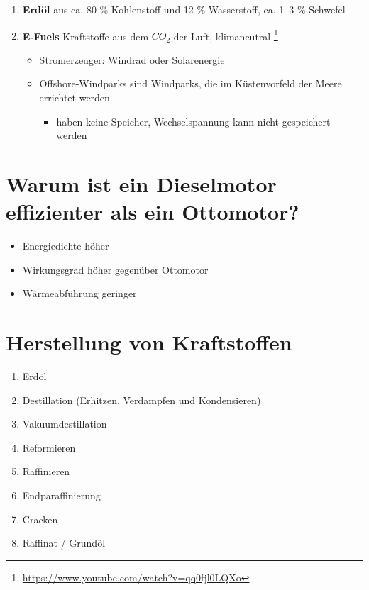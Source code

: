 \begin{enumerate}
\item
  \textbf{Erdöl} aus ca. 80 \% Kohlenstoff und 12 \% Wasserstoff, ca.
  1--3 \% Schwefel
\item
  \textbf{E-Fuels} Kraftstoffe aus dem $CO_2$ der Luft, klimaneutral
  \footnote{\url{https://www.youtube.com/watch?v=qq0fjl0LQXo}}

  \begin{itemize}
  \item
    Stromerzeuger: Windrad oder Solarenergie
  \item
    Offshore-Windparks sind Windparks, die im Küstenvorfeld der Meere
    errichtet werden.

    \begin{itemize}
    \item
      haben keine Speicher, Wechselspannung kann nicht gespeichert
      werden
    \end{itemize}
  \end{itemize}
\end{enumerate}

\section{Warum ist ein Dieselmotor effizienter als ein
Ottomotor?}\label{warum-ist-ein-dieselmotor-effizienter-als-ein-ottomotor}

\begin{itemize}
\item
  Energiedichte höher
\item
  Wirkungsgrad höher gegenüber Ottomotor
\item
  Wärmeabführung geringer
\end{itemize}

\section{Herstellung von
Kraftstoffen}\label{herstellung-von-kraftstoffen}

\begin{enumerate}
\item
  Erdöl
\item
  Destillation (Erhitzen, Verdampfen und Kondensieren)
\item
  Vakuumdestillation
\item
  Reformieren
\item
  Raffinieren
\item
  Endparaffinierung
\item
  Cracken
\item
  Raffinat / Grundöl
\end{enumerate}

